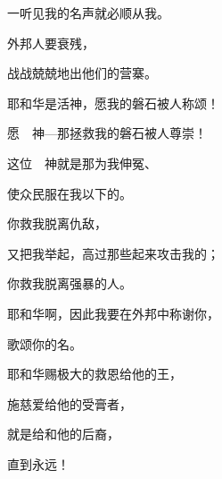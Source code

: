{\par }{\Q 一听见我的名声就必顺从我。
\par }{\Q {}外邦人要衰残，
\par }{\Q 战战兢兢地出他们的营寨。
\par }{\BB \par }{\Q {}耶和华是活神，愿我的磐石被人称颂！
\par }{\Q 愿　神—那拯救我的磐石被人尊崇！
\par }{\Q {}这位　神就是那为我伸冤、
\par }{\Q 使众民服在我以下的。
\par }{\Q {}你救我脱离仇敌，
\par }{\Q 又把我举起，高过那些起来攻击我的；
\par }{\Q 你救我脱离强暴的人。
\par }{\BB \par }{\Q {}耶和华啊，因此我要在外邦中称谢你，
\par }{\Q 歌颂你的名。
\par }{\Q {}耶和华赐极大的救恩给他{}的王，
\par }{\Q 施慈爱给他的受膏者，
\par }{\Q 就是给{}和他的后裔，
\par }{\Q 直到永远！

}
